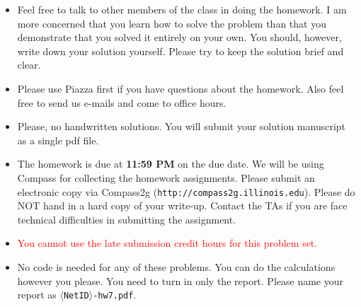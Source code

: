 
\usepackage{amsmath,url,graphicx,amssymb}
\usepackage{xcolor}
\sloppy

\oddsidemargin 0in
\evensidemargin 0in
\textwidth 6.5in
\topmargin -0.5in
\textheight 9.0in

\newcommand{\tight}[1]{\!#1\!}
\newcommand{\loose}[1]{\;#1\;}




\begin{footnotesize}
\begin{itemize}
\item Feel free to talk to other members of the class in doing the homework.
I am more concerned that you learn how to solve the problem than that you
demonstrate that you solved it entirely on your own.  You should, however,
write down your solution yourself.  Please try to keep the solution brief
and clear.

\item Please use Piazza first if you have questions about the homework.
Also feel free to send us e-mails and come to office hours.

\item Please, no handwritten solutions.  You will submit your solution
manuscript as a single pdf file.

\item The homework is due at \textbf{11:59 PM} on the due date. We will be
using Compass for collecting the homework assignments. Please submit an
electronic copy via Compass2g (\texttt{http://compass2g.illinois.edu}).
Please do NOT hand in a hard copy of your write-up.  Contact the TAs if you
are face technical difficulties in submitting the assignment.

\item \textcolor{red}{You cannot use the late submission credit hours for
this problem set.}

\item No code is needed for any of these problems. You can do the
calculations however you please. You need to turn in only the report. Please
name your report as \texttt{$\langle$NetID$\rangle$-hw7.pdf}.
\end{itemize}
\end{footnotesize}

